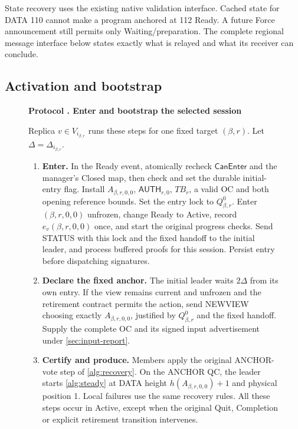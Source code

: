 \documentclass[11pt,a4paper]{article}
\newcommand{\TB}{\mathit{TB}}
\newcommand{\tagg}[1]{\ensuremath{\mathsf{#1}}}
\newcounter{protocol}
\newenvironment{protocol}[3][htbp]{\begin{figure}[#1]\refstepcounter{protocol}\label{#2}
\begin{mdframed}[linewidth=.6pt,skipabove=0pt,skipbelow=0pt,
innertopmargin=7pt,innerbottommargin=7pt]\small
\textbf{Protocol \theprotocol. #3}\par\smallskip}{\end{mdframed}\end{figure}}
\begin{document}
State recovery uses the existing native validation interface. Cached state
for DATA 110 cannot make a program anchored at 112 Ready. A future Force
announcement still permits only Waiting/preparation. The complete regional
message interface below states exactly what is relayed and what its
receiver can conclude.



\subsection{Activation and bootstrap}
\label{sec:ready}
\begin{protocol}[H]{alg:bootstrap}{Enter and bootstrap the selected session}
Replica $v\in V_{i_{\beta,r}}$ runs these steps for one fixed target
$(\beta,r)$. Let $\Delta=\Delta_{i_{\beta,r}}$.
\begin{enumerate}[label=\textbf{\arabic*)},itemsep=3pt]
\item \textbf{Enter.} In the Ready event, atomically recheck
$\tagg{CanEnter}$ and the manager's Closed map, then check and set
the durable initial-entry flag. Install $A_{\beta,r,0,0}$,
$\tagg{AUTH}_{r,0}$, $\TB_r$, a valid OC and both opening reference bounds.
Set the entry lock to $Q^0_{\beta,r}$. Enter $(\beta,r,0,0)$
unfrozen, change Ready to Active, record $e_v(\beta,r,0,0)$ once,
and start the original progress checks. Send STATUS with this lock
and the fixed handoff to the initial leader, and process buffered
proofs for this session. Persist entry before dispatching signatures.
\item \textbf{Declare the fixed anchor.} The initial leader waits
$2\Delta$ from its own entry. If the view remains current and
unfrozen and the retirement contract permits the action, send NEWVIEW
choosing exactly $A_{\beta,r,0,0}$, justified by $Q^0_{\beta,r}$
and the fixed handoff. Supply the complete OC and its signed
input advertisement under \cref{sec:input-report}.
\item \textbf{Certify and produce.} Members apply the original
ANCHOR-vote step of \cref{alg:recovery}. On the ANCHOR QC, the leader
starts \cref{alg:steady} at DATA height $h(A_{\beta,r,0,0})+1$
and physical position 1. Local failures use the same recovery rules.
All these steps occur in Active, except when the original Quit,
Completion or explicit retirement transition intervenes.
\end{enumerate}
\end{protocol}
\end{document}
